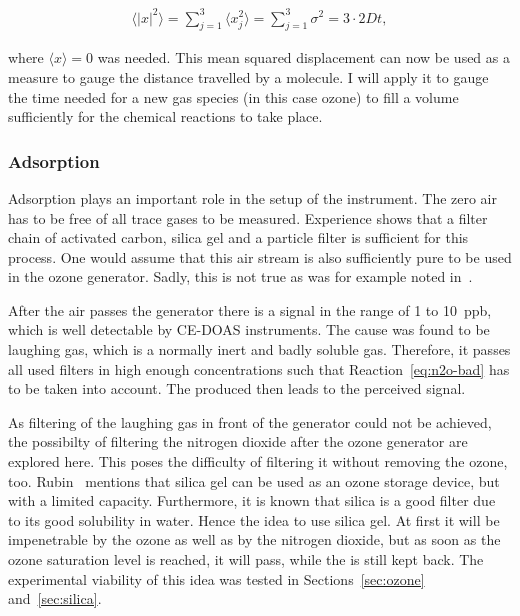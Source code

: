 \begin{align}
  \langle |x|^2 \rangle = \sum_{j=1}^3 \langle
  x_j^2 \rangle = \sum_{j=1}^3 \sigma^2 = 3 \cdot 2Dt, \label{eq:mqd}
\end{align}

where $\langle x \rangle = 0$ was needed. This mean squared
displacement can now be used as a measure to gauge the distance
travelled by a molecule. I will apply it to gauge the time needed for
a new gas species (in this case ozone) to fill a volume sufficiently
for the chemical reactions to take place.

\subsubsection{Adsorption}
\label{sec:adsorption}

Adsorption plays an important role in the setup of the instrument. The
zero air has to be free of all trace gases to be measured. Experience
shows that a filter chain of activated carbon, silica gel and a
particle filter is sufficient for this process. One would assume that
this air stream is also sufficiently pure to be used in the ozone
generator. Sadly, this is not true as was for example noted
in~\cite{bsc}.

After the air passes the generator there is a  signal in the
range of \num{1} to \SI{10}{ppb}, which is well detectable by CE-DOAS
instruments. The cause was found to be laughing gas, which is a
normally inert and badly soluble gas. Therefore, it passes all used
filters in high enough concentrations such that
Reaction~\eqref{eq:n2o-bad} has to be taken into account. The produced
 then leads to the perceived  signal.

As filtering of the laughing gas in front of the generator could not
be achieved, the possibilty of filtering the nitrogen dioxide after
the ozone generator are explored here. This poses the difficulty of
filtering it without removing the ozone, too. Rubin~\cite{ozone-silica}
mentions that silica gel can be used as an ozone storage
device, but with a limited capacity. Furthermore, it is known that
silica is a good  filter due to its good solubility in
water. Hence the idea to use silica gel. At first it will be
impenetrable by the ozone as well as by the nitrogen dioxide, but as
soon as the ozone saturation level is reached, it will pass, while the
 is still kept back. The experimental viability of this idea
was tested in Sections~\ref{sec:ozone} and~\ref{sec:silica}.

